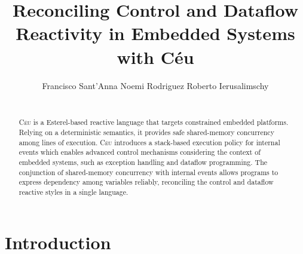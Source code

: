 \documentclass{acm_proc_article-sp}
\newcommand{\CEU}{\textsc{C\'{e}u}\xspace}
\newcommand{\1}{\;}
\newcommand{\2}{\;\;}
\newcommand{\3}{\;\;\;}
\newcommand{\5}{\;\;\;\;\;}
\begin{document}
\title {
    Reconciling Control and Dataflow Reactivity in Embedded Systems with C\'eu
}

\author{
    \alignauthor
    Francisco Sant'Anna \hspace{1cm} Noemi Rodriguez \hspace{1cm} Roberto Ierusalimschy   \\
     \\
}

\maketitle

\begin{abstract}
\CEU is a Esterel-based reactive language that targets constrained embedded 
platforms.
%
Relying on a deterministic semantics, it provides safe shared-memory 
concurrency among lines of execution.
%
\CEU introduces a stack-based execution policy for internal events which 
enables advanced control mechanisms considering the context of embedded 
systems, such as exception handling and dataflow programming.
%
The conjunction of shared-memory concurrency with internal events allows 
programs to express dependency among variables reliably, reconciling the 
control and dataflow reactive styles in a single language.
%
\end{abstract}




\section{Introduction}

\end{document}
